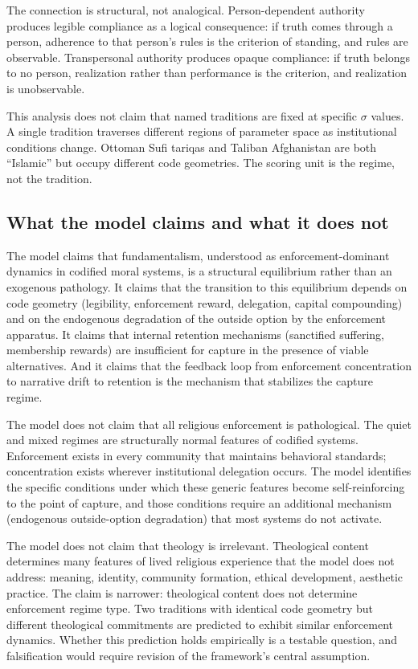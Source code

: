 \documentclass[12pt]{article}
\begin{document}
The connection is structural, not analogical. Person-dependent authority produces legible compliance as a logical consequence: if truth comes through a person, adherence to that person's rules is the criterion of standing, and rules are observable. Transpersonal authority produces opaque compliance: if truth belongs to no person, realization rather than performance is the criterion, and realization is unobservable.

This analysis does not claim that named traditions are fixed at specific $\sigma$ values. A single tradition traverses different regions of parameter space as institutional conditions change. Ottoman Sufi tariqas and Taliban Afghanistan are both ``Islamic'' but occupy different code geometries. The scoring unit is the regime, not the tradition.

\subsection{What the model claims and what it does not}

The model claims that fundamentalism, understood as enforcement-dominant dynamics in codified moral systems, is a structural equilibrium rather than an exogenous pathology. It claims that the transition to this equilibrium depends on code geometry (legibility, enforcement reward, delegation, capital compounding) and on the endogenous degradation of the outside option by the enforcement apparatus. It claims that internal retention mechanisms (sanctified suffering, membership rewards) are insufficient for capture in the presence of viable alternatives. And it claims that the feedback loop from enforcement concentration to narrative drift to retention is the mechanism that stabilizes the capture regime.

The model does not claim that all religious enforcement is pathological. The quiet and mixed regimes are structurally normal features of codified systems. Enforcement exists in every community that maintains behavioral standards; concentration exists wherever institutional delegation occurs. The model identifies the specific conditions under which these generic features become self-reinforcing to the point of capture, and those conditions require an additional mechanism (endogenous outside-option degradation) that most systems do not activate.

The model does not claim that theology is irrelevant. Theological content determines many features of lived religious experience that the model does not address: meaning, identity, community formation, ethical development, aesthetic practice. The claim is narrower: theological content does not determine enforcement regime type. Two traditions with identical code geometry but different theological commitments are predicted to exhibit similar enforcement dynamics. Whether this prediction holds empirically is a testable question, and falsification would require revision of the framework's central assumption.
\end{document}
